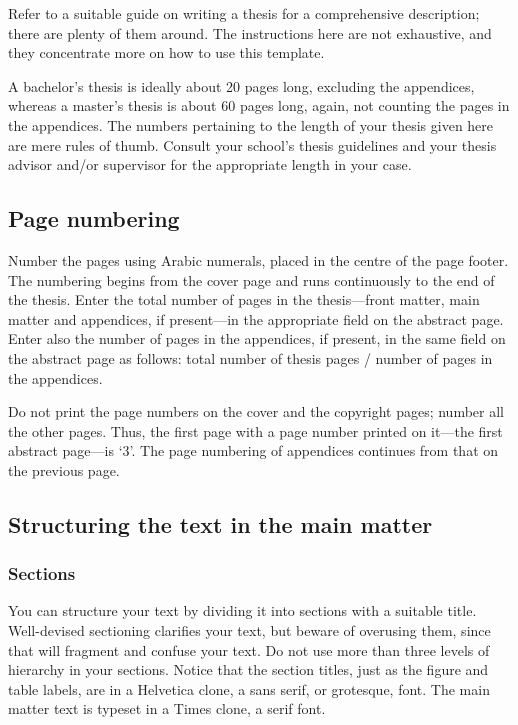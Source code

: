 \documentclass[english, 12pt, a4paper, elec, utf8, a-2b, online]{aaltothesis}
\begin{document}
Refer to a suitable guide on writing a thesis for a comprehensive description;
there are plenty of them around. The instructions here are not exhaustive, and
they concentrate more on how to use this template.

A bachelor’s thesis is ideally about 20 pages long, excluding the appendices, 
whereas a master’s thesis is about 60 pages long, again, not counting the pages
in the appendices. The numbers pertaining to the length of your thesis given
here are mere rules of thumb. Consult your school’s thesis guidelines and your 
thesis advisor and/or supervisor for the appropriate length in your case.


\subsection{Page numbering}
Number the pages using Arabic numerals, placed in the centre of the page footer.
The numbering begins from the cover page and runs continuously to the end of the 
thesis. Enter the total number of pages in the thesis---front matter, main
matter and appendices, if present---in the appropriate field on the abstract
page. Enter also the number of pages in the appendices, if present, in the same 
field on the abstract page as follows: total number of thesis pages / number of 
pages in the appendices.

Do not print the page numbers on the cover and the copyright pages; number all
the other pages. Thus, the first page with a page number printed on it---the
first abstract page---is ‘3’. The page numbering of appendices continues from
that on the previous page.


\subsection{Structuring the text in the main matter}
\subsubsection{Sections}

You can structure your text by dividing it into sections with a suitable title. 
Well-devised sectioning clarifies your text, but beware of overusing them, since 
that will fragment and confuse your text. Do not use more than three levels of 
hierarchy in your sections. Notice that the section titles, just as the figure
and table labels, are in a Helvetica clone, a sans serif, or grotesque, font. 
The main matter text is typeset in a Times clone, a serif font.
\end{document}
